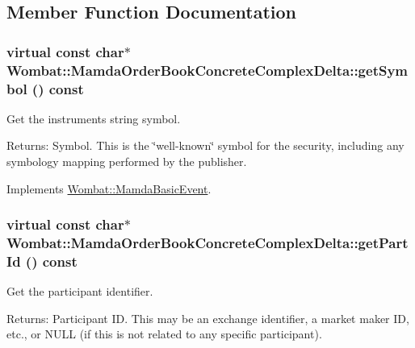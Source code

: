 \subsection{Member Function Documentation}
\hypertarget{classWombat_1_1MamdaOrderBookConcreteComplexDelta_01e27e6bf2bf1e021ffdb8e2c6a265bf}{
\subsubsection[getSymbol]{\setlength{\rightskip}{0pt plus 5cm}virtual const char$\ast$ Wombat::Mamda\-Order\-Book\-Concrete\-Complex\-Delta::get\-Symbol () const}}
\label{classWombat_1_1MamdaOrderBookConcreteComplexDelta_01e27e6bf2bf1e021ffdb8e2c6a265bf}


Get the instruments string symbol. 

\begin{Desc}
\item[Returns:]Symbol. This is the \char`\"{}well-known\char`\"{} symbol for the security, including any symbology mapping performed by the publisher. \end{Desc}


Implements \hyperlink{classWombat_1_1MamdaBasicEvent_8783b136a1305d21c578ced8618c090b}{Wombat::Mamda\-Basic\-Event}.\hypertarget{classWombat_1_1MamdaOrderBookConcreteComplexDelta_caacf40ac5c44468404832849d4d738e}{
\subsubsection[getPartId]{\setlength{\rightskip}{0pt plus 5cm}virtual const char$\ast$ Wombat::Mamda\-Order\-Book\-Concrete\-Complex\-Delta::get\-Part\-Id () const}}
\label{classWombat_1_1MamdaOrderBookConcreteComplexDelta_caacf40ac5c44468404832849d4d738e}


Get the participant identifier. 

\begin{Desc}
\item[Returns:]Participant ID. This may be an exchange identifier, a market maker ID, etc., or NULL (if this is not related to any specific participant). \end{Desc}


